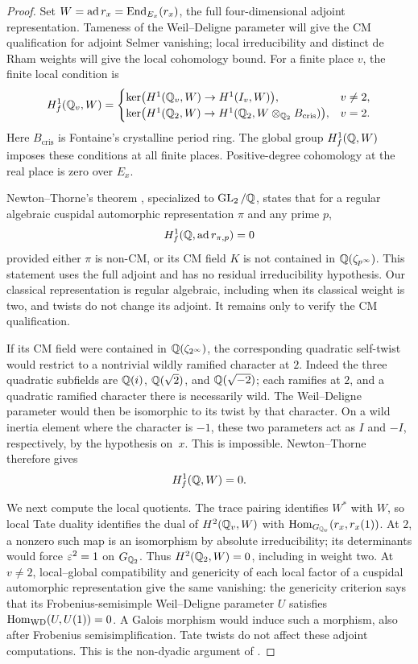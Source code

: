 \begin{proof}
Set $W=\operatorname{ad} r_x=\operatorname{End}_{E_x}(r_x)$, the full four-dimensional
adjoint representation. Tameness of the Weil--Deligne parameter will
give the CM qualification for adjoint Selmer vanishing; local
irreducibility and distinct de Rham weights will give the local
cohomology bound. For a finite place $v$, the finite local
condition is
\[
 H^1_f(\mathbb Q_v,W)=
 \begin{cases}
  \ker\bigl(H^1(\mathbb Q_v,W)\to H^1(I_v,W)\bigr),&v\ne2,\\
  \ker\bigl(H^1(\mathbb Q_2,W)\to
        H^1(\mathbb Q_2,W\otimes_{\mathbb Q_2}B_{\mathrm{cris}})\bigr),&v=2.
\end{cases}
\]
Here $B_{\mathrm{cris}}$ is Fontaine's crystalline period ring.
The global group $H^1_f(\mathbb Q,W)$ imposes these conditions at all
finite places.  Positive-degree cohomology at the real place is
zero over $E_x$.

Newton--Thorne's theorem \cite[Theorem~5.4]{NewtonThorne2023},
specialized to $\operatorname{GL}_2/\mathbb Q$, states that for a regular algebraic
cuspidal automorphic representation $\pi$ and any prime $p$,
\[
 H^1_f(\mathbb Q,\operatorname{ad} r_{\pi,p})=0
\]
provided either $\pi$ is non-CM, or its CM field $K$ is not
contained in $\mathbb Q(\zeta_{p^\infty})$.  This statement uses the
full adjoint and has no residual irreducibility hypothesis.
Our classical representation is regular algebraic, including
when its classical weight is two, and twists do not change its
adjoint.  It remains only to verify the CM qualification.

If its CM field were contained in $\mathbb Q(\zeta_{2^\infty})$, the
corresponding quadratic self-twist would restrict to a nontrivial
wildly ramified character at $2$.  Indeed the three quadratic
subfields are $\mathbb Q(i)$, $\mathbb Q(\sqrt2)$, and $\mathbb Q(\sqrt{-2})$;
each ramifies at $2$, and a quadratic ramified character there
is necessarily wild.  The Weil--Deligne parameter would then
be isomorphic to its twist by that character.  On a wild inertia
element where the character is $-1$, these two parameters act
as $I$ and $-I$, respectively, by the hypothesis on~$x$.
This is impossible.  Newton--Thorne therefore gives
\begin{equation}\label{eq:global-adjoint-selmer}
 H^1_f(\mathbb Q,W)=0.
\end{equation}

We next compute the local quotients.  The trace pairing identifies
$W^*$ with $W$, so local Tate duality identifies the dual of
$H^2(\mathbb Q_v,W)$ with $\operatorname{Hom}_{G_{\mathbb Q_v}}(r_x,r_x(1))$.
At $2$, a nonzero such map is an isomorphism by absolute
irreducibility; its determinants would force $\varepsilon^2=1$ on
$G_{\mathbb Q_2}$. Thus $H^2(\mathbb Q_2,W)=0$, including in weight two.
At $v\ne2$, local--global compatibility
\cite[Theorem~A]{Carayol1986} and genericity of each local factor
of a cuspidal automorphic representation give the same vanishing:
the genericity criterion
\cite[Lemma~1.1.3]{Allen2016} says that its Frobenius-semisimple
Weil--Deligne parameter $U$ satisfies
$\operatorname{Hom}_{\mathrm{WD}}(U,U(1))=0$.
A Galois morphism would induce such a morphism, also after
Frobenius semisimplification.  Tate twists do not affect these
adjoint computations.  This is the non-dyadic argument of
\cite[Lemma~5.2]{Dim}.


\end{proof}
